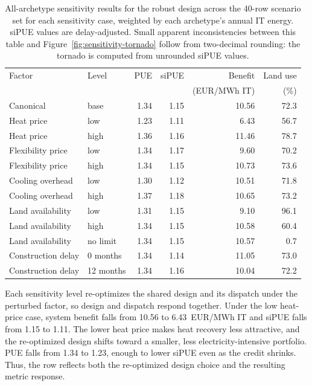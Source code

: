 \documentclass[preprint,12pt]{elsarticle}
\begin{document}
\begin{table}[tbp]
\centering
\small
\caption{All-archetype sensitivity results for the robust design across the 40-row scenario set for each sensitivity case, weighted by each archetype's annual IT energy. siPUE values are delay-adjusted. Small apparent inconsistencies between this table and Figure~\ref{fig:sensitivity-tornado} follow from two-decimal rounding: the tornado is computed from unrounded siPUE values.}
\label{tab:sensitivity-summary}
\begin{tabularx}{\linewidth}{L{2.5cm} L{2.25cm} r r r r}
\toprule
Factor & Level & PUE & siPUE & Benefit & Land use \\
 & & & & (EUR/MWh IT) & (\%) \\
\midrule
Canonical & base & 1.34 & 1.15 & 10.56 & 72.3 \\
Heat price & low & 1.23 & 1.11 & 6.43 & 56.7 \\
Heat price & high & 1.36 & 1.16 & 11.46 & 78.7 \\
Flexibility price & low & 1.34 & 1.17 & 9.60 & 70.2 \\
Flexibility price & high & 1.34 & 1.15 & 10.73 & 73.6 \\
Cooling overhead & low & 1.30 & 1.12 & 10.51 & 71.8 \\
Cooling overhead & high & 1.37 & 1.18 & 10.65 & 73.2 \\
Land availability & low & 1.31 & 1.15 & 9.10 & 96.1 \\
Land availability & high & 1.34 & 1.15 & 10.58 & 60.4 \\
Land availability & no limit & 1.34 & 1.15 & 10.57 & 0.7 \\
Construction delay & 0 months & 1.34 & 1.14 & 11.05 & 73.0 \\
Construction delay & 12 months & 1.34 & 1.16 & 10.04 & 72.2 \\
\bottomrule
\end{tabularx}
\end{table}

Each sensitivity level re-optimizes the shared design and its dispatch under the perturbed factor, so design and dispatch respond together. Under the low heat-price case, system benefit falls from 10.56 to 6.43~EUR/MWh IT and siPUE falls from 1.15 to 1.11. The lower heat price makes heat recovery less attractive, and the re-optimized design shifts toward a smaller, less electricity-intensive portfolio. PUE falls from 1.34 to 1.23, enough to lower siPUE even as the credit shrinks. Thus, the row reflects both the re-optimized design choice and the resulting metric response.
\end{document}
